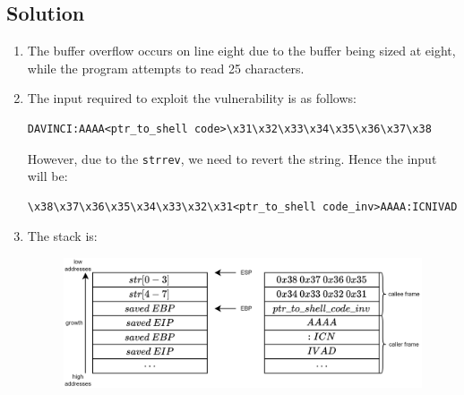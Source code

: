 \subsection*{Solution}
\begin{enumerate}
    \item The buffer overflow occurs on line eight due to the buffer being sized at eight, while the program attempts to read 25 characters.
    \item The input required to exploit the vulnerability is as follows:
        \begin{verbatim}
DAVINCI:AAAA<ptr_to_shell code>\x31\x32\x33\x34\x35\x36\x37\x38
        \end{verbatim}
        However, due to the \texttt{strrev}, we need to revert the string. 
        Hence the input will be:
        \begin{verbatim}
\x38\x37\x36\x35\x34\x33\x32\x31<ptr_to_shell code_inv>AAAA:ICNIVAD
        \end{verbatim}
    \item The stack is: 
    \begin{figure}[H]
        \centering
        \includegraphics[width=0.85\linewidth]{images/stack2.png}
    \end{figure}
\end{enumerate}